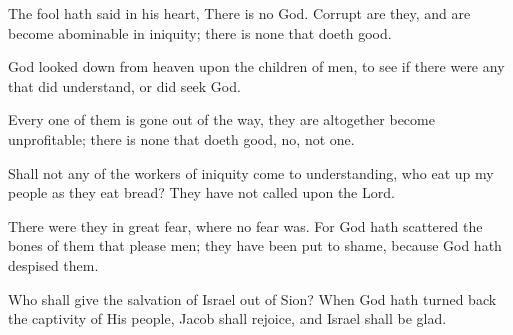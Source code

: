 The fool hath said in his heart, There is no God. Corrupt are they, and are become abominable in iniquity; there is none that doeth good.

God looked down from heaven upon the children of men, to see if there were any that did understand, or did seek God.

Every one of them is gone out of the way, they are altogether become unprofitable; there is none that doeth good, no, not one.

Shall not any of the workers of iniquity come to understanding, who eat up my people as they eat bread? They have not called upon the Lord.

There were they in great fear, where no fear was. For God hath scattered the bones of them that please men; they have been put to shame, because God hath despised them.

Who shall give the salvation of Israel out of Sion? When God hath turned back the captivity of His people, Jacob shall rejoice, and Israel shall be glad.
